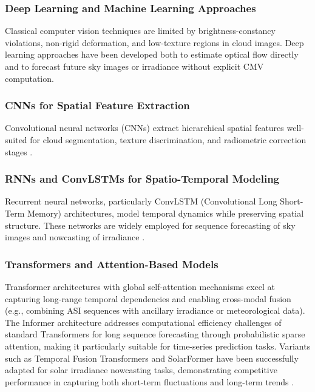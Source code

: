 \subsubsection{Deep Learning and Machine Learning Approaches}
\label{sec:deep_learning}

Classical computer vision techniques are limited by brightness-constancy violations, non-rigid deformation, and low-texture regions in cloud images. Deep learning approaches have been developed both to estimate optical flow directly and to forecast future sky images or irradiance without explicit CMV computation.

\subsubsection*{CNNs for Spatial Feature Extraction}
Convolutional neural networks (CNNs) extract hierarchical spatial features well-suited for cloud segmentation, texture discrimination, and radiometric correction stages \cite{nouri2021skycam,doshi2022,jung2020}.

\subsubsection*{RNNs and ConvLSTMs for Spatio-Temporal Modeling}
Recurrent neural networks, particularly ConvLSTM (Convolutional Long Short-Term Memory) architectures, model temporal dynamics while preserving spatial structure. These networks are widely employed for sequence forecasting of sky images and nowcasting of irradiance \cite{shi2015,qin2022cloudcast}.

\subsubsection*{Transformers and Attention-Based Models}
Transformer architectures \cite{vaswani2017} with global self-attention mechanisms excel at capturing long-range temporal dependencies and enabling cross-modal fusion (e.g., combining ASI sequences with ancillary irradiance or meteorological data). The Informer architecture \cite{zhou2021informer} addresses computational efficiency challenges of standard Transformers for long sequence forecasting through probabilistic sparse attention, making it particularly suitable for time-series prediction tasks. Variants such as Temporal Fusion Transformers and SolarFormer have been successfully adapted for solar irradiance nowcasting tasks, demonstrating competitive performance in capturing both short-term fluctuations and long-term trends \cite{alorf2025temporal,li2024solarformer}.

